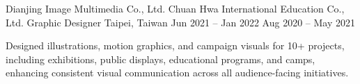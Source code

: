 \begin{cventries}
  \cventry
    {Dianjing Image Multimedia Co., Ltd. \newline\vspace{-2pt} Chuan Hwa International Education Co., Ltd.} %
    {Graphic Designer} %
    {Taipei, Taiwan} %
    {Jun 2021 -- Jan 2022 \newline\vspace{-2pt} Aug 2020 -- May 2021} %
    {
      \vspace{-4.0mm}
      \begin{cvitems}
        \item {Designed illustrations, motion graphics, and campaign visuals for 10+ projects, including exhibitions, public displays, educational programs, and camps, enhancing consistent visual communication across all audience-facing initiatives.}
      \end{cvitems}
    }
\end{cventries}
